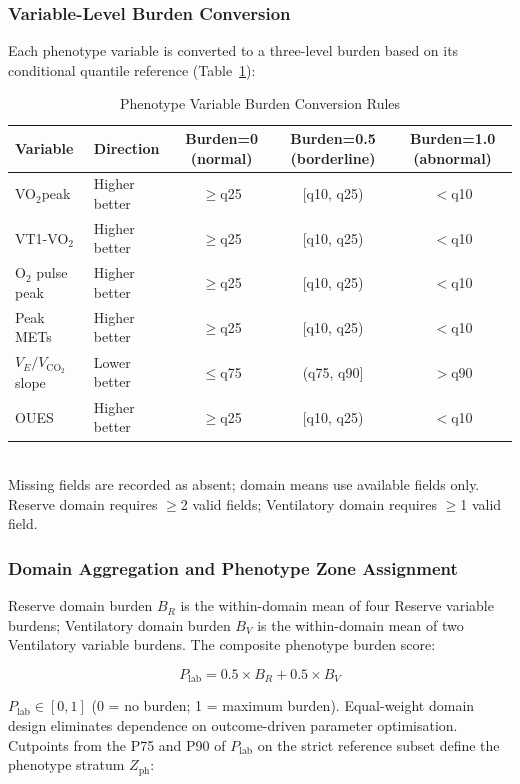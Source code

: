 \documentclass[12pt, a4paper]{article}
\begin{document}
\subsubsection{Variable-Level Burden Conversion}

Each phenotype variable is converted to a three-level burden based on its
conditional quantile reference (Table~\ref{tab:burden_rules_en}):

\begin{table}[htbp]
\centering
\small
\caption{Phenotype Variable Burden Conversion Rules}
\label{tab:burden_rules_en}
\begin{tabular}{llccc}
\toprule
Variable & Direction & Burden=0 (normal) & Burden=0.5 (borderline) & Burden=1.0 (abnormal) \\
\midrule
VO$_2$peak & Higher better & $\geq$q25 & [q10, q25) & $<$q10 \\
VT1-VO$_2$ & Higher better & $\geq$q25 & [q10, q25) & $<$q10 \\
O$_2$ pulse peak & Higher better & $\geq$q25 & [q10, q25) & $<$q10 \\
Peak METs & Higher better & $\geq$q25 & [q10, q25) & $<$q10 \\
$V_E/V_{\text{CO}_2}$ slope & Lower better & $\leq$q75 & (q75, q90] & $>$q90 \\
OUES & Higher better & $\geq$q25 & [q10, q25) & $<$q10 \\
\bottomrule
\end{tabular}
\\[1ex]
{\footnotesize Missing fields are recorded as absent; domain means use available fields only.
Reserve domain requires $\geq$2 valid fields; Ventilatory domain requires $\geq$1 valid field.}
\end{table}

\subsubsection{Domain Aggregation and Phenotype Zone Assignment}

Reserve domain burden $B_R$ is the within-domain mean of four Reserve variable
burdens; Ventilatory domain burden $B_V$ is the within-domain mean of two
Ventilatory variable burdens. The composite phenotype burden score:

\begin{equation}
\label{eq:plab_en}
P_{\text{lab}} = 0.5 \times B_R + 0.5 \times B_V
\end{equation}

$P_{\text{lab}} \in [0, 1]$ (0 = no burden; 1 = maximum burden). Equal-weight
domain design eliminates dependence on outcome-driven parameter optimisation.
Cutpoints from the P75 and P90 of $P_{\text{lab}}$ on the strict reference
subset define the phenotype stratum $Z_{\text{ph}}$:
\end{document}
